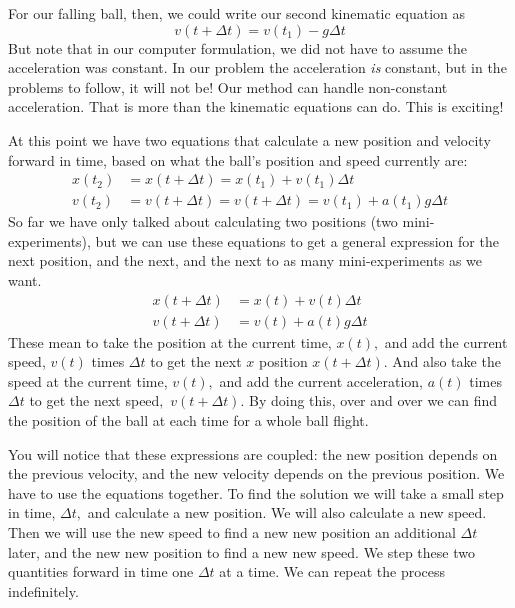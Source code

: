 \documentclass[twoside,11pt,ShortChapTitles]{BYUTextbook}
\begin{document}
For our falling ball, then, we could write our second kinematic equation as
\[
v(t+\Delta t)=v(t_{1})-g\Delta t
\]
But note that in our computer formulation, we did not have to assume the
acceleration was constant. In our problem the acceleration \emph{is} constant,
but in the problems to follow, it will not be! Our method can handle
non-constant acceleration. That is more than the kinematic equations can do.
This is exciting!

At this point we have two equations that calculate a new position and velocity
forward in time, based on what the ball's position and speed currently are: \begin{align*}
x(t_{2})  & =x(t+\Delta t)=x(t_{1})+v(t_{1})\Delta t\\
v(t_{2})  & =v(t+\Delta t)=v(t+\Delta t)=v(t_{1})+a(t_{1})g\Delta t
\end{align*}
So far we have only talked about calculating two positions (two
mini-experiments), but we can use these equations to get a general expression
for the next position, and the next, and the next to as many mini-experiments
as we want.
\begin{align*}
x(t+\Delta t)  & =x(t)+v(t)\Delta t\\
v(t+\Delta t)  & =v(t)+a(t)g\Delta t
\end{align*}
These mean to take the position at the current time, $x(t),$ and add the
current speed, $v\left(  t\right)  $ times $\Delta t$ to get the next $x$
position $x\left(  t+\Delta t\right)  .$ And also take the speed at the
current time, $v(t),$ and add the current acceleration, $a\left(  t\right)  $
times $\Delta t$ to get the next speed$,$ $v\left(  t+\Delta t\right)  .$ By
doing this, over and over we can find the position of the ball at each time
for a whole ball flight.

You will notice that these expressions are coupled: the new position depends
on the previous velocity, and the new velocity depends on the previous
position. We have to use the equations together. To find the solution we will
take a small step in time, $\Delta t,$ and calculate a new position. We will
also calculate a new speed. Then we will use the new speed to find a new new
position an additional $\Delta t$ later, and the new new position to find a
new new speed. We step these two quantities forward in time one $\Delta t$ at
a time. We can repeat the process indefinitely.
\end{document}
